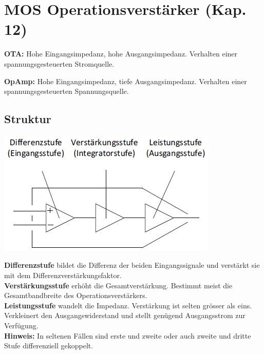 \newpage
\section{MOS Operationsverstärker (Kap. 12)}
\begin{minipage}[c]{0.5\textwidth}
	\textbf{OTA:} Hohe Eingangsimpedanz, hohe Ausgangsimpedanz. Verhalten einer spannungsgesteuerten Stromquelle.
\end{minipage}
\begin{minipage}[c]{0.5\textwidth}
	\textbf{OpAmp:} Hohe Eingangsimpedanz, tiefe Ausgangsimpedanz. Verhalten einer spannungsgesteuerten Spannungsquelle.
\end{minipage}

\subsection{Struktur}
\begin{minipage}[c]{0.3\textwidth}
	\includegraphics[width=1\linewidth]{chapters/OpAmp/images/Blockstruktur}
\end{minipage}
\begin{minipage}[c]{0.7\textwidth}
	\textbf{Differenzstufe} bildet die Differenz der beiden Eingangssignale und verstärkt sie mit dem Differenzverstärkungsfaktor.\\
	\textbf{Verstärkungsstufe} erhöht die Gesamtverstärkung. Bestimmt meist die Gesamtbandbreite des Operationsverstärkers.\\
	\textbf{Leistungsstufe} wandelt die Impedanz. Verstärkung ist selten grösser als eins. Verkleinert den Ausgangswiderstand und stellt genügend Ausgangsstrom zur Verfügung.\\[1ex]
	\textbf{Hinweis:} In seltenen Fällen sind erste und zweite oder auch zweite und dritte Stufe differenziell gekoppelt.
\end{minipage}

